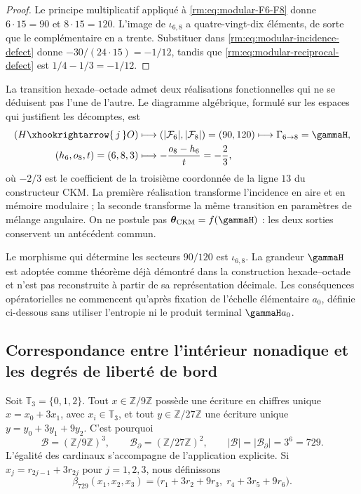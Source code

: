 \begin{proof}
Le principe multiplicatif appliqué à
\cref{rm:eq:modular-F6-F8} donne \(6\cdot15=90\) et \(8\cdot15=120\).
L'image de \(\iota_{6,8}\) a quatre-vingt-dix éléments, de sorte que le
complémentaire en a trente. Substituer dans
\cref{rm:eq:modular-incidence-defect} donne
\(-30/(24\cdot15)=-1/12\), tandis que
\cref{rm:eq:modular-reciprocal-defect} est
\(1/4-1/3=-1/12\).
\end{proof}

La transition hexade--octade admet deux réalisations fonctionnelles qui ne
se déduisent pas l'une de l'autre. Le diagramme algébrique, formulé sur les espaces
qui justifient les décomptes, est
\begin{equation}
\label{rm:eq:modular-68-two-readers}
\begin{aligned}
(H\xhookrightarrow{\,j\,}O)
&\longmapsto
\left(|\mathcal F_6|,|\mathcal F_8|\right)=(90,120)
\longmapsto\Gamma_{6\to8}=\gammaH,\\
(h_6,o_8,t)=(6,8,3)
&\longmapsto-\frac{o_8-h_6}{t}=-\frac23,
\end{aligned}
\end{equation}
où \(-2/3\) est le coefficient de la troisième coordonnée de la ligne
\(13\) du constructeur CKM. La première réalisation transforme
l'incidence en aire et en mémoire modulaire ; la seconde transforme la même
transition en paramètres de mélange angulaire.
On ne postule pas \(\boldsymbol\theta_{\rm CKM}=f(\gammaH)\) : les deux sorties
conservent un antécédent commun.

Le morphisme qui détermine les secteurs \(90/120\) est \(\iota_{6,8}\). La grandeur \(\gammaH\) est adoptée comme théorème déjà démontré dans la construction hexade--octade et n’est pas reconstruite à partir de sa représentation décimale. Les conséquences opératorielles ne commencent qu’après fixation de l’échelle élémentaire \(a_0\), définie ci-dessous sans utiliser l’entropie ni le produit terminal \(\gammaH a_0\).

\subsection{Correspondance entre l'intérieur nonadique et les degrés de liberté de bord}

Soit \(\mathbb T_3=\{0,1,2\}\). Tout \(x\in\mathbb Z/9\mathbb Z\) possède
une écriture en chiffres unique
\(x=x_0+3x_1\), avec \(x_i\in\mathbb T_3\), et tout
\(y\in\mathbb Z/27\mathbb Z\) une écriture unique
\(y=y_0+3y_1+9y_2\). C'est pourquoi
\begin{equation}
\label{rm:eq:modular-bulk-boundary-729}
\mathcal B=(\mathbb Z/9\mathbb Z)^3,
\qquad
\mathcal B_\partial=(\mathbb Z/27\mathbb Z)^2,
\qquad
|\mathcal B|=|\mathcal B_\partial|=3^6=729.
\end{equation}
L'égalité des cardinaux s'accompagne de l'application explicite. Si
\(x_j=r_{2j-1}+3r_{2j}\) pour \(j=1,2,3\), nous définissons
\begin{equation}
\label{rm:eq:modular-beta729}
\beta_{729}(x_1,x_2,x_3)
=\bigl(r_1+3r_2+9r_3,\;r_4+3r_5+9r_6\bigr).
\end{equation}

